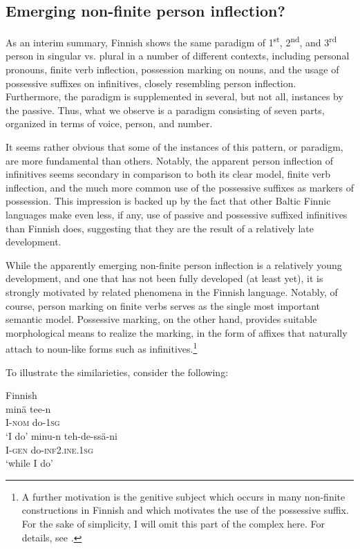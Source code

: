 \documentclass[output=paper, colorlinks,citecolor=brown]{langsci/langscibook}
\begin{document}
\subsection{Emerging non-finite person inflection?}\label{sec:leino_4.6}

As an interim summary, Finnish shows the same paradigm of 1\textsuperscript{st}, 2\textsuperscript{nd}, and 3\textsuperscript{rd} person in singular vs. plural in a number of different contexts, including personal pronouns, finite verb inflection, possession marking on nouns, and the usage of possessive suffixes on infinitives, closely resembling person inflection. Furthermore, the paradigm is supplemented in several, but not all, instances by the passive. Thus, what we observe is a paradigm consisting of seven parts, organized in terms of voice, person, and number.

It seems rather obvious that some of the instances of this pattern, or paradigm, are more fundamental than others. Notably, the apparent person inflection of infinitives seems secondary in comparison to both its clear model, finite verb inflection, and the much more common use of the possessive suffixes as markers of possession. This impression is backed up by the fact that other Baltic Finnic languages make even less, if any, use of passive and possessive suffixed infinitives than Finnish does, suggesting that they are the result of a relatively late development.

\begin{sloppypar}
While the apparently emerging non-finite person inflection is a relatively young development, and one that has not been fully developed (at least yet), it is strongly motivated by related phenomena in the Finnish language. Notably, of course, person marking on finite verbs serves as the single most important semantic model. Possessive marking, on the other hand, provides suitable morphological means to realize the marking, in the form of affixes that naturally attach to noun-like forms such as infinitives.\footnote{A further motivation is the genitive subject which occurs in many non-finite constructions in Finnish and which motivates the use of the possessive suffix. For the sake of simplicity, I will omit this part of the complex here. For details, see \citet{Leino2015}.} 
\end{sloppypar}

To illustrate the similarieties, consider the following:

\ea\label{ex:leino_13}
{Finnish}\\
\ea
\gll minä    tee-n\\
     I-\textsc{nom}  do-\textsc{1sg} \\ 
\glt `I do' \label{ex:leino:13a}
\ex \label{ex:leino:13b}
\gll minu-n  teh-de-ssä-ni\\
     I-\textsc{gen}    do-\textsc{inf2.ine.1sg}\\
\glt `while I do'
\end{document}
